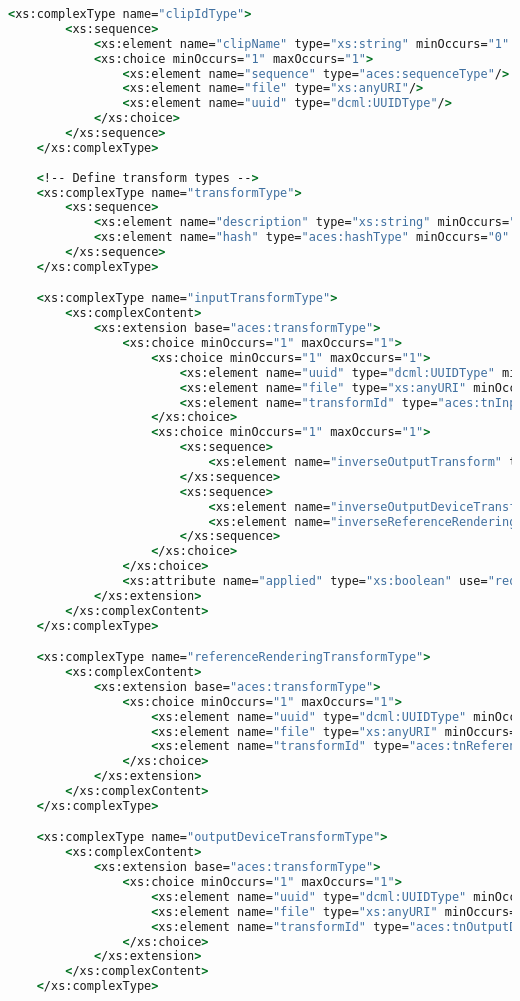 \begin{lstlisting}[language=csh]
	<xs:complexType name="clipIdType">
		<xs:sequence>
			<xs:element name="clipName" type="xs:string" minOccurs="1" maxOccurs="1"/>
			<xs:choice minOccurs="1" maxOccurs="1">
				<xs:element name="sequence" type="aces:sequenceType"/>
				<xs:element name="file" type="xs:anyURI"/>
				<xs:element name="uuid" type="dcml:UUIDType"/>
			</xs:choice>
		</xs:sequence>
	</xs:complexType>
	
	<!-- Define transform types -->
	<xs:complexType name="transformType">
		<xs:sequence>
			<xs:element name="description" type="xs:string" minOccurs="0" maxOccurs="1"/>
			<xs:element name="hash" type="aces:hashType" minOccurs="0" maxOccurs="1"/>
		</xs:sequence>
	</xs:complexType>

	<xs:complexType name="inputTransformType">
		<xs:complexContent>
			<xs:extension base="aces:transformType">
				<xs:choice minOccurs="1" maxOccurs="1">
					<xs:choice minOccurs="1" maxOccurs="1">
						<xs:element name="uuid" type="dcml:UUIDType" minOccurs="1" maxOccurs="1"/>
						<xs:element name="file" type="xs:anyURI" minOccurs="1" maxOccurs="1"/>
						<xs:element name="transformId" type="aces:tnInputTransform" minOccurs="1" maxOccurs="1"/>
					</xs:choice>
					<xs:choice minOccurs="1" maxOccurs="1">
						<xs:sequence>
							<xs:element name="inverseOutputTransform" type="aces:inverseOutputTransformType" minOccurs="1" maxOccurs="1"/>
						</xs:sequence>
						<xs:sequence>
							<xs:element name="inverseOutputDeviceTransform" type="aces:inverseOutputDeviceTransformType" minOccurs="1" maxOccurs="1"/>
							<xs:element name="inverseReferenceRenderingTransform" type="aces:inverseReferenceRenderingTransformType" minOccurs="1" maxOccurs="1"/>
						</xs:sequence>
					</xs:choice>
				</xs:choice>
				<xs:attribute name="applied" type="xs:boolean" use="required"/>
			</xs:extension>
		</xs:complexContent>
	</xs:complexType>

	<xs:complexType name="referenceRenderingTransformType">
		<xs:complexContent>
			<xs:extension base="aces:transformType">
				<xs:choice minOccurs="1" maxOccurs="1">
					<xs:element name="uuid" type="dcml:UUIDType" minOccurs="1" maxOccurs="1"/>
					<xs:element name="file" type="xs:anyURI" minOccurs="1" maxOccurs="1"/>
					<xs:element name="transformId" type="aces:tnReferenceRenderingTransform" minOccurs="1" maxOccurs="1"/>
				</xs:choice>
			</xs:extension>
		</xs:complexContent>
	</xs:complexType>

	<xs:complexType name="outputDeviceTransformType">
		<xs:complexContent>
			<xs:extension base="aces:transformType">
				<xs:choice minOccurs="1" maxOccurs="1">
					<xs:element name="uuid" type="dcml:UUIDType" minOccurs="1" maxOccurs="1"/>
					<xs:element name="file" type="xs:anyURI" minOccurs="1" maxOccurs="1"/>
					<xs:element name="transformId" type="aces:tnOutputDeviceTransform" minOccurs="1" maxOccurs="1"/>
				</xs:choice>
			</xs:extension>
		</xs:complexContent>
	</xs:complexType>
	

\end{lstlisting}
